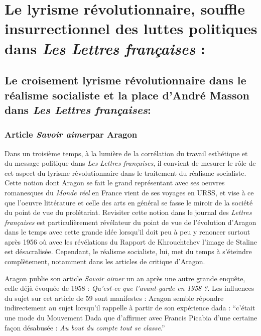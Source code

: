\chapter{Le lyrisme révolutionnaire, souffle insurrectionnel des luttes politiques dans \emph{Les Lettres françaises} :}

\section{Le croisement lyrisme révolutionnaire dans le réalisme socialiste  et la place d’André Masson dans \emph{Les Lettres françaises}:}

\subsection{Article \emph{Savoir aimer}par Aragon}

Dans un troisième temps, à la lumière de la corrélation du travail esthétique et du message politique dans \emph{Les Lettres françaises}, il convient de mesurer le rôle de cet aspect du lyrisme révolutionnaire dans le traitement du réalisme socialiste. Cette notion dont Aragon se fait le grand représentant avec ses oeuvres romanesques du \emph{Monde réel} en France vient de ses voyages en URSS, et vise à ce que l’oeuvre littérature et celle des arts en général se fasse le miroir de la société du point de vue du prolétariat. Revisiter cette notion dans le journal des \emph{Lettres françaises} est particulièrement révélateur du point de vue de l’évolution d’Aragon dans le temps avec cette grande idée lorsqu’il doit peu à peu y renoncer surtout après 1956 où avec les révélations du Rapport de Khrouchtchev l’image de Staline est désacralisée. Cependant, le réalisme socialiste, lui, met du temps à s’éteindre complètement, notamment dans les articles de critique d’Aragon. 

	 Aragon publie son article \emph{Savoir aimer} un an après une autre grande enquête, celle déjà évoquée de 1958 : \emph{Qu’est-ce que l’avant-garde en 1958 ?}. Les influences du sujet sur cet article de 59 sont manifestes : Aragon semble répondre indirectement au sujet lorsqu’il rappelle à partir de son expérience dada : \enquote{c’était une mode du Mouvement Dada que d’affirmer avec Francis Picabia d’une certaine façon désabusée : \emph{Au bout du compte tout se classe}.}


